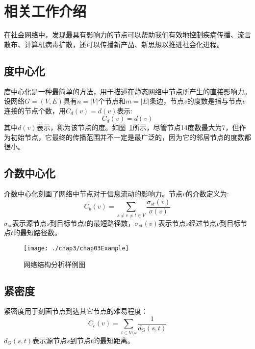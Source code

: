 \section{相关工作介绍}
在社会网络中，发现最具有影响力的节点可以帮助我们有效地控制疾病传播、流言散布、计算机病毒扩散，还可以传播新产品、新思想以推进社会化进程。
\subsection{度中心化}
度中心化\cite{freeman1979centrality,sabidussi1966centrality}是一种最简单的方法，用于描述在静态网络中节点所产生的直接影响力。设网络$G=(V,E)$具有$n=|V|$个节点和$m=|E|$条边，节点$v$的度数是指与节点$v$连接的节点个数，用$C_d(v)=d(v)$表示:
\begin{equation} 
\label{equ:chap3:degreeCentral}
C_d(v)=d(v)
\end{equation}
其中$d(v)$表示，称为该节点的度。如图~\ref{fig:chap03Example}所示，尽管节点14度数最大为7，但作为初始节点，它最终的传播范围并不一定是最广泛的，因为它的邻居节点的度数都很小。


\subsection{介数中心化}
介数中心化刻画了网络中节点对于信息流动的影响力。节点$v$的介数\cite{freeman1979centrality}定义为:
\begin{equation} 
\label{equ:chap3:betweenness}
C_b(v)= \sum _{s\neq v\neq t \in V} \frac{\sigma _{st}(v)}{\sigma (v)}
\end{equation}
$\sigma _{st}$表示源节点$s$到目标节点$t$的最短路径数，$\sigma _{st}(v)$表示节点$s$经过节点$v$到目标节点$t$的最短路径数。

\begin{figure}[H] 
	\centering
	\texttt{[image: ./chap3/chap03Example]}
	\caption{网络结构分析样例图}
	\label{fig:chap03Example}
\end{figure}

\subsection{紧密度}
紧密度\cite{opsahl2010node,sabidussi1966centrality}用于刻画节点到达其它节点的难易程度：
\begin{equation} 
\label{equ:chap3:closeness}
C_c(v)= \sum _{t\in V \setminus s} \frac{1}{d_G(s,t)}
\end{equation}
$d_G(s,t)$表示源节点$s$到节点$t$的最短距离。

